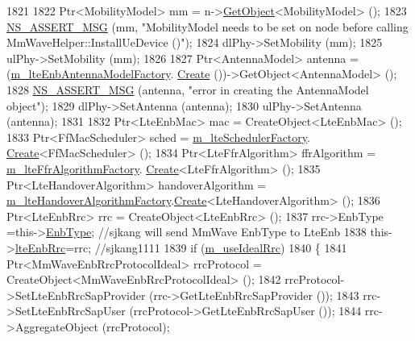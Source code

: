\begin{DoxyCode}
1821 
1822         Ptr<MobilityModel> mm = n->\hyperlink{classns3_1_1Object_a13e18c00017096c8381eb651d5bd0783}{GetObject}<MobilityModel> ();
1823         \hyperlink{assert_8h_aff5ece9066c74e681e74999856f08539}{NS\_ASSERT\_MSG} (mm, \textcolor{stringliteral}{"MobilityModel needs to be set on node before calling
       MmWaveHelper::InstallUeDevice ()"});
1824         dlPhy->SetMobility (mm);
1825         ulPhy->SetMobility (mm);
1826 
1827         Ptr<AntennaModel> antenna = (\hyperlink{classns3_1_1MmWaveHelper_a1548fc8f90466b690f5cbbe5cd19ff34}{m\_lteEnbAntennaModelFactory}.
      \hyperlink{classns3_1_1ObjectFactory_a18152e93f0a6fe184ed7300cb31e9896}{Create} ())->GetObject<AntennaModel> ();
1828         \hyperlink{assert_8h_aff5ece9066c74e681e74999856f08539}{NS\_ASSERT\_MSG} (antenna, \textcolor{stringliteral}{"error in creating the AntennaModel object"});
1829         dlPhy->SetAntenna (antenna);
1830         ulPhy->SetAntenna (antenna);
1831 
1832         Ptr<LteEnbMac> mac = CreateObject<LteEnbMac> ();
1833         Ptr<FfMacScheduler> sched = \hyperlink{classns3_1_1MmWaveHelper_af6c9cfed446ae4f664b7e046da34f69e}{m\_lteSchedulerFactory}.
      \hyperlink{classns3_1_1ObjectFactory_a18152e93f0a6fe184ed7300cb31e9896}{Create}<FfMacScheduler> ();
1834         Ptr<LteFfrAlgorithm> ffrAlgorithm = \hyperlink{classns3_1_1MmWaveHelper_a707c9644320d1406c8dafb28ddd1727e}{m\_lteFfrAlgorithmFactory}.
      \hyperlink{classns3_1_1ObjectFactory_a18152e93f0a6fe184ed7300cb31e9896}{Create}<LteFfrAlgorithm> ();
1835         Ptr<LteHandoverAlgorithm> handoverAlgorithm = 
      \hyperlink{classns3_1_1MmWaveHelper_a741c82df6a1249b8fc519a3db26913a3}{m\_lteHandoverAlgorithmFactory}.\hyperlink{classns3_1_1ObjectFactory_a18152e93f0a6fe184ed7300cb31e9896}{Create}<LteHandoverAlgorithm> ();
1836         Ptr<LteEnbRrc> rrc = CreateObject<LteEnbRrc> ();
1837      rrc->EnbType =this->\hyperlink{classns3_1_1MmWaveHelper_a5da34e3048341219417e4e2c154527e5}{EnbType}; \textcolor{comment}{//sjkang will send MmWave EnbType to LteEnb}
1838      this->\hyperlink{classns3_1_1MmWaveHelper_a877dec693e5e6669a413ef40e6f7f873}{lteEnbRrc}=rrc; \textcolor{comment}{//sjkang1111}
1839         \textcolor{keywordflow}{if} (\hyperlink{classns3_1_1MmWaveHelper_ad41fdb2996a6f53385b146bb60f476dc}{m\_useIdealRrc})
1840         \{
1841           Ptr<MmWaveEnbRrcProtocolIdeal> rrcProtocol = CreateObject<MmWaveEnbRrcProtocolIdeal> ();
1842           rrcProtocol->SetLteEnbRrcSapProvider (rrc->GetLteEnbRrcSapProvider ());
1843           rrc->SetLteEnbRrcSapUser (rrcProtocol->GetLteEnbRrcSapUser ());
1844           rrc->AggregateObject (rrcProtocol);

\end{DoxyCode}
